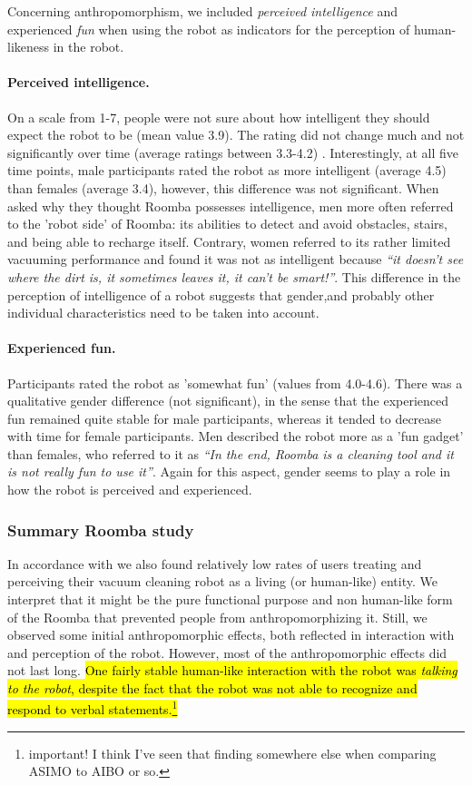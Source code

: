 \documentclass{frontiersSCNS} %
\begin{document}
Concerning anthropomorphism, we included \textit{perceived intelligence} and experienced \textit{fun} when using the robot as indicators for the perception of human-likeness in the robot.

\paragraph*{Perceived intelligence.} On a scale from 1-7, people were not sure about how intelligent they should expect the robot to be (mean value 3.9). The rating did not change much and not significantly over time (average ratings between 3.3-4.2) \citep{fink_living_2013}. Interestingly, at all five time points, male participants rated the robot as more intelligent (average 4.5) than females (average 3.4), however, this difference was not significant. When asked why they thought Roomba possesses intelligence, men more often referred to the 'robot side' of Roomba: its abilities to detect and avoid obstacles, stairs, and being able to recharge itself. Contrary, women referred to its rather limited vacuuming performance and found it was not as intelligent because \textit{``it doesn't see where the dirt is, it sometimes leaves it, it can't be smart!''}. This difference in the perception of intelligence of a robot suggests that gender,and probably other individual characteristics need to be taken into account.

\paragraph*{Experienced fun.} Participants rated the robot as 'somewhat fun' (values from 4.0-4.6). There was a qualitative gender difference (not significant), in the sense that the experienced fun remained quite stable for male participants, whereas it tended to decrease with time for female participants. Men described the robot more as a 'fun gadget' than females, who referred to it as \textit{``In the end, Roomba is a cleaning tool and it is not really fun to use it''}. Again for this aspect, gender seems to play a role in how the robot is perceived and experienced. 

\subsubsection{Summary Roomba study\\}

In accordance with \cite{sung_housewives_2008} we also found relatively low rates of users treating and perceiving their vacuum cleaning robot as a living (or human-like) entity. We interpret that it might be the pure functional purpose and non human-like form of the Roomba that prevented people from anthropomorphizing it. Still, we observed some initial anthropomorphic effects, both reflected in interaction with and perception of the robot. However, most of the anthropomorphic effects did not last long. \hl{One fairly stable human-like interaction with the robot was \textit{talking to the robot}, despite the fact that the robot was not able to recognize and respond to verbal statements.\footnote{important! I think I've seen that finding somewhere else when comparing ASIMO to AIBO or so.}}
\end{document}
